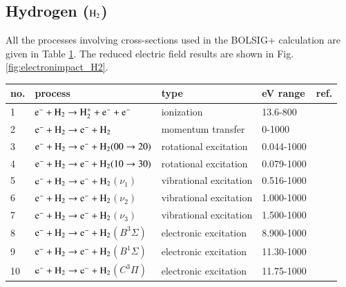 %
\subsection{Hydrogen ($\rm H_2$)}

All the processes involving cross-sections used in the BOLSIG+ calculation are given in Table \ref{tab:tableH2}. The reduced electric field results are shown in Fig. \ref{fig:electronimpact_H2}.

\begin{table}[!htbp]
  \center{}
  \begin{threeparttable}
    \label{tab:tableH2}
    \begin{tabular*}{\textwidth}{l@{\extracolsep{\fill}}llll}
    \toprule
    {no.}  & {process} & {type} &  {eV range}  &  {ref.} \\
    \midrule
      1 & $\rm e^- + H_2 \rightarrow H_2^+ + e^- + e^-$  &  ionization  &  13.6-800  &  \cite{lxc:2024:morgan} \\ 
        \midrule
      2 & $\rm e^- + H_2 \rightarrow e^- + H_2$  &  momentum transfer   &  0-1000  & \cite{lxc:2024:morgan}\\  
        \midrule
      3 & $\rm e^- + H_2 \rightarrow e^- + H_2(00\rightarrow 20)$  &  rotational excitation   &  0.044-1000  & \cite{lxc:2024:morgan}\\ 
      4 & $\rm e^- + H_2 \rightarrow e^- + H_2(10\rightarrow 30)$  &  rotational excitation   &  0.079-1000  & \cite{lxc:2024:morgan}\\ 
              \midrule
      5 & $\rm e^- + H_2 \rightarrow e^- + H_2$$(\nu_1)$  &  vibrational excitation   &  0.516-1000  & \cite{lxc:2024:morgan}\\
      6 & $\rm e^- + H_2 \rightarrow e^- + H_2$$(\nu_2)$  &  vibrational excitation   &  1.000-1000  & \cite{lxc:2024:morgan}\\
      7 & $\rm e^- + H_2 \rightarrow e^- + H_2$$(\nu_3)$  &  vibrational excitation   &  1.500-1000  & \cite{lxc:2024:morgan}\\
                    \midrule
      8 & $\rm e^- + H_2 \rightarrow e^- + H_2$$(B^3\Sigma)$  &  electronic excitation   &  8.900-1000  & \cite{lxc:2024:morgan}\\
      9 & $\rm e^- + H_2 \rightarrow e^- + H_2$$(B^1\Sigma)$  &  electronic excitation   &  11.30-1000  & \cite{lxc:2024:morgan}\\
      10 & $\rm e^- + H_2 \rightarrow e^- + H_2$$(C^3\Pi)$  &  electronic excitation   &  11.75-1000  & \cite{lxc:2024:morgan}\\

\end{tabular*}
\end{threeparttable}
\end{table}
